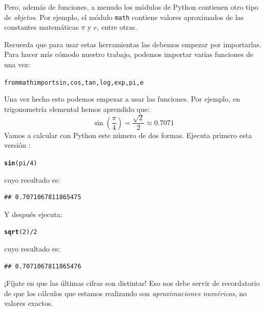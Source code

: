 \documentclass[10pt,a4paper]{article}\usepackage[]{graphicx}\usepackage[]{color}
\makeatletter
\newcommand{\hlnum}[1]{\textcolor[rgb]{0.686,0.059,0.569}{#1}}%
\newcommand{\hlopt}[1]{\textcolor[rgb]{0,0,0}{#1}}%
\newcommand{\hlstd}[1]{\textcolor[rgb]{0.345,0.345,0.345}{#1}}%
\newcommand{\hlkwd}[1]{\textcolor[rgb]{0.737,0.353,0.396}{\textbf{#1}}}%
\newenvironment{kframe}{%
 \def\at@end@of@kframe{}%
 \ifinner\ifhmode%
  \def\at@end@of@kframe{\end{minipage}}%
  \begin{minipage}{\columnwidth}%
 \fi\fi%
 \def\FrameCommand##1{\hskip\@totalleftmargin \hskip-\fboxsep
 \colorbox{shadecolor}{##1}\hskip-\fboxsep
     \hskip-\linewidth \hskip-\@totalleftmargin \hskip\columnwidth}%
 \MakeFramed {\advance\hsize-\width
   \@totalleftmargin\z@ \linewidth\hsize
   \@setminipage}}%
 {\par\unskip\endMakeFramed%
 \at@end@of@kframe}
\newenvironment{knitrout}{}{} %
\newcounter {cont01}
\makeatother
\begin{document}
Pero, además de funciones, a menudo los módulos de Python contienen otro tipo de {\em objetos}. Por ejemplo, el módulo {\tt math} contiene valores aproximados de las constantes matemáticas $\pi$ y $e$, entre otras.

Recuerda que para usar estas herramientas las debemos empezar por importarlas. Para hacer más cómodo nuestro trabajo, podemos importar varias funciones de una vez:
\begin{knitrout}
\color{fgcolor}\begin{kframe}
\begin{alltt}
from math import sin, cos, tan, log, exp, pi, e
\end{alltt}
\end{kframe}
\end{knitrout}
Una vez hecho esto podemos empezar a usar las funciones. Por ejemplo, en trigonometría elemental hemos aprendido que:
$$\sin\left(\dfrac{\pi}{4}\right) = \dfrac{\sqrt{2}}{2}\approx 0.7071$$
Vamos a calcular con Python este número de dos formas. Ejecuta primero esta versión :
\begin{knitrout}
\color{fgcolor}\begin{kframe}
\begin{alltt}
\hlkwd{sin}\hlstd{(pi}\hlopt{/}\hlnum{4}\hlstd{)}
\end{alltt}
\end{kframe}
\end{knitrout}
cuyo resultado es:
\begin{knitrout}
\color{fgcolor}\begin{kframe}
\begin{verbatim}
## 0.7071067811865475
\end{verbatim}
\end{kframe}
\end{knitrout}
Y después ejecuta:
\begin{knitrout}
\color{fgcolor}\begin{kframe}
\begin{alltt}
\hlkwd{sqrt}\hlstd{(}\hlnum{2}\hlstd{)}\hlopt{/}\hlnum{2}
\end{alltt}
\end{kframe}
\end{knitrout}
cuyo resultado es:
\begin{knitrout}
\color{fgcolor}\begin{kframe}
\begin{verbatim}
## 0.7071067811865476
\end{verbatim}
\end{kframe}
\end{knitrout}
¡Fíjate en que las últimas cifras son distintas! Eso nos debe servir de recordatorio de que los cálculos que estamos realizando son {\em aproximaciones numéricas}, no valores exactos.
\end{document}
